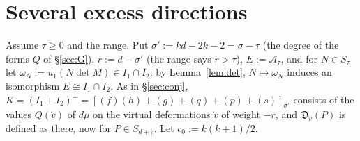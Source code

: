 \documentclass[11pt]{article}
\numberwithin{equation}{section}
\theoremstyle{remark}
\newcommand{\cA}{\mathcal{A}}
\begin{document}
\section{Several excess directions}\label{sec:FA2}

Assume $\tau\ge0$ and the range. Put $\sigma':=kd-2k-2=\sigma-\tau$ (the degree of the forms $Q$ of
\S\ref{sec:G}), $r:=d-\sigma'$ (the range says $r>\tau$), $E:=\cA_\tau$, and for $N\in S_\tau$ let
$\omega_N:=u_1(N\det M)\in I_1\cap I_2$; by Lemma~\ref{lem:det}, $N\mapsto\omega_N$ induces an isomorphism
$E\cong I_1\cap I_2$. As in \S\ref{sec:conj}, $K=(I_1+I_2)^\perp=[(f)(h)+(g)+(q)+(p)+(s)]_{\sigma'}$ consists of the
values $Q(\dot v)$ of $d\mu$ on the virtual deformations $\dot v$ of weight $-r$, and $\mathfrak D_{\dot v}(P)$ is
defined as there, now for $P\in S_{d+\tau}$. Let $c_0:=k(k+1)/2$.
\end{document}
